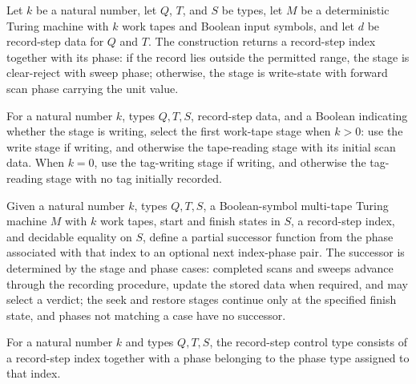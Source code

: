\begin{definition}
\label{Turing.recordStepApply}
\leanok
{}
Let $k$ be a natural number, let $Q$, $T$, and $S$ be types, let $M$ be a deterministic
Turing machine with $k$ work tapes and Boolean input symbols, and let $d$ be record-step
data for $Q$ and $T$. The construction returns a record-step index together with its
phase: if the record lies outside the permitted range, the stage is clear-reject with
sweep phase; otherwise, the stage is write-state with forward scan phase carrying the
unit value.
\end{definition}

\begin{definition}
\label{Turing.recordStepFirstTape}
\leanok
{}
For a natural number $k$, types $Q,T,S$, record-step data, and a Boolean indicating
whether the stage is writing, select the first work-tape stage when $k>0$: use the write
stage if writing, and otherwise the tape-reading stage with its initial scan data. When
$k=0$, use the tag-writing stage if writing, and otherwise the tag-reading stage with no
tag initially recorded.
\end{definition}

\begin{definition}
\label{Turing.recordStepNext}
\leanok
{}
Given a natural number $k$, types $Q,T,S$, a Boolean-symbol multi-tape Turing machine
$M$ with $k$ work tapes, start and finish states in $S$, a record-step index, and
decidable equality on $S$, define a partial successor function from the phase associated
with that index to an optional next index-phase pair. The successor is determined by the
stage and phase cases: completed scans and sweeps advance through the recording
procedure, update the stored data when required, and may select a verdict; the seek and
restore stages continue only at the specified finish state, and phases not matching a
case have no successor.
\end{definition}

\begin{definition}
\label{Turing.RecordStepControl}
\leanok
{}
For a natural number $k$ and types $Q,T,S$, the record-step control type consists of a
record-step index together with a phase belonging to the phase type assigned to that
index.
\end{definition}

